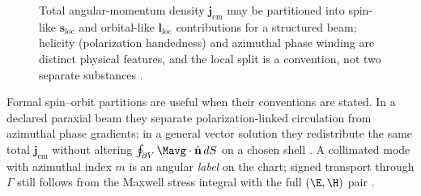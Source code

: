 \begin{figure}[!htbp]
\centering
{}
\caption{Total angular-momentum density $\mathbf{j}_{\mathrm{em}}$ may be partitioned into spin-like $\mathbf{s}_{\mathrm{loc}}$ and orbital-like $\mathbf{l}_{\mathrm{loc}}$ contributions for a structured beam; helicity (polarization handedness) and azimuthal phase winding are distinct physical features, and the local split is a convention, not two separate substances \cite{belinfante1940,allen1992}.}
\label{fig:ch1.spin-orbit-decomposition}
\end{figure}

Formal spin--orbit partitions are useful when their conventions are stated. In a declared paraxial beam they separate polarization-linked circulation from azimuthal phase gradients; in a general vector solution they redistribute the same total $\mathbf{j}_{\mathrm{em}}$ without altering $\oint_{\partial V}\Mavg\cdot\hat{\mathbf{n}}\,dS$ on a chosen shell \cite{belinfante1940,allen1992,stratton1941}. A collimated mode with azimuthal index $m$ is an angular \emph{label} on the chart; signed transport through $\Gamma$ still follows from the Maxwell stress integral with the full $(\E,\H)$ pair \cite{allen1992,stratton1941}.

\FloatBarrier
